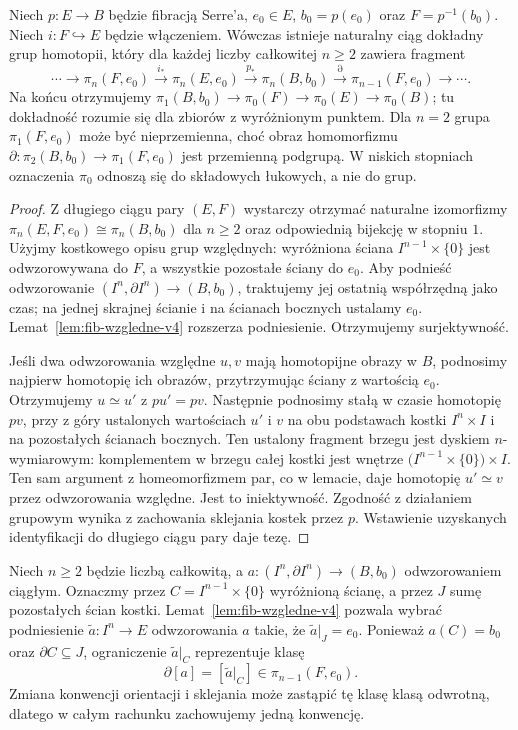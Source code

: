 \begin{twierdzenie}
\label{thm:fib-les-v4}
Niech $p:E\to B$ będzie fibracją Serre'a, $e_0\in E$,
$b_0=p(e_0)$ oraz $F=p^{-1}(b_0)$. Niech $i:F\hookrightarrow E$
będzie włączeniem. Wówczas istnieje naturalny ciąg dokładny grup
homotopii, który dla każdej liczby całkowitej $n\geq2$
zawiera fragment
\[
\cdots\to\pi_n(F,e_0)\xrightarrow{i_*}\pi_n(E,e_0)
\xrightarrow{p_*}\pi_n(B,b_0)\xrightarrow{\partial}\pi_{n-1}(F,e_0)
\to\cdots.
\]
Na końcu otrzymujemy $\pi_1(B,b_0)\to\pi_0(F)\to\pi_0(E)\to\pi_0(B)$;
tu dokładność rozumie się dla zbiorów z wyróżnionym punktem.
Dla $n=2$ grupa $\pi_1(F,e_0)$ może być nieprzemienna,
choć obraz homomorfizmu $\partial:\pi_2(B,b_0)\to\pi_1(F,e_0)$
jest przemienną podgrupą. W niskich stopniach
oznaczenia $\pi_0$ odnoszą się do składowych łukowych,
a nie do grup.
\end{twierdzenie}
\begin{proof}
Z długiego ciągu pary $(E,F)$ wystarczy otrzymać naturalne
izomorfizmy $\pi_n(E,F,e_0)\cong\pi_n(B,b_0)$ dla $n\ge2$
oraz odpowiednią bijekcję w stopniu $1$.
Użyjmy kostkowego opisu grup względnych: wyróżniona ściana
$I^{n-1}\times\{0\}$ jest odwzorowywana do $F$, a wszystkie
pozostałe ściany do $e_0$. Aby podnieść odwzorowanie
$(I^n,\partial I^n)\to(B,b_0)$, traktujemy jej ostatnią
współrzędną jako czas; na jednej skrajnej ścianie i na ścianach
bocznych ustalamy $e_0$. Lemat~\ref{lem:fib-wzgledne-v4}
rozszerza podniesienie. Otrzymujemy surjektywność.

Jeśli dwa odwzorowania względne $u,v$ mają homotopijne obrazy w $B$,
podnosimy najpierw homotopię ich obrazów, przytrzymując ściany
z wartością $e_0$. Otrzymujemy $u\simeq u'$ z $pu'=pv$.
Następnie podnosimy stałą w czasie homotopię $pv$, przy
z góry ustalonych wartościach $u'$ i $v$ na obu podstawach
kostki $I^n\times I$ i na pozostałych ścianach bocznych.
Ten ustalony fragment brzegu jest dyskiem $n$-wymiarowym:
komplementem w brzegu całej kostki jest wnętrze
$\bigl(I^{n-1}\times\{0\}\bigr)\times I$. Ten sam argument
z homeomorfizmem par, co w lemacie, daje homotopię
$u'\simeq v$ przez odwzorowania względne. Jest to iniektywność.
Zgodność z działaniem grupowym wynika z zachowania
sklejania kostek przez $p$. Wstawienie uzyskanych identyfikacji
do długiego ciągu pary daje tezę.
\end{proof}

\begin{uwaga}
Niech $n\geq2$ będzie liczbą całkowitą, a
$a:(I^n,\partial I^n)\to(B,b_0)$ odwzorowaniem ciągłym.
Oznaczmy przez $C=I^{n-1}\times\{0\}$ wyróżnioną ścianę,
a przez $J$ sumę pozostałych ścian kostki.
Lemat~\ref{lem:fib-wzgledne-v4} pozwala wybrać
podniesienie $\widetilde a:I^n\to E$ odwzorowania $a$
takie, że $\widetilde a|_J=e_0$.
Ponieważ $a(C)=b_0$ oraz $\partial C\subseteq J$,
ograniczenie $\widetilde a|_C$ reprezentuje klasę
\[
 \partial[a]=[\widetilde a|_C]\in\pi_{n-1}(F,e_0).
\]
Zmiana konwencji orientacji i sklejania może zastąpić
tę klasę klasą odwrotną, dlatego w całym rachunku
zachowujemy jedną konwencję.
\end{uwaga}

